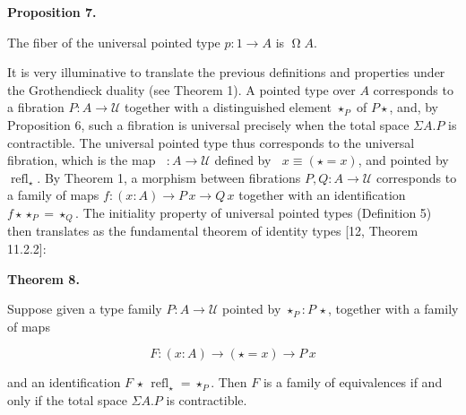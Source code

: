  
 
\par\medskip\noindent\textbf{Proposition 7.}\par
 
 
The fiber of the universal pointed type $p:1\to A$ is $\operatorname{\Omega}A$.\par
 
 
 
 
It is very illuminative to translate the previous definitions and properties under the Grothendieck duality (see Theorem 1). A pointed type over $A$ corresponds to a fibration $P:A\to\mathcal{U}$ together with a distinguished element $\star_{P}$ of $P\star$, and, by Proposition 6, such a fibration is universal precisely when the total space $\Sigma A.P$ is contractible. The universal pointed type thus corresponds to the universal fibration, which is the map $\mathop{\mathcal{F}_{A}}:A\to\mathcal{U}$ defined by $\mathop{\mathcal{F}_{A}}x\equiv(\star=x)$, and pointed by $\operatorname{refl}_{\star}$. By Theorem 1, a morphism between fibrations $P,Q:A\to\mathcal{U}$ corresponds to a family of maps $f:(x:A)\to P\,x\to Q\,x$ together with an identification $f\star\star_{P}=\star_{Q}$. The initiality property of universal pointed types (Definition 5) then translates as the fundamental theorem of identity types [12, Theorem 11.2.2]:\par
 
 
 
\par\medskip\noindent\textbf{Theorem 8.}\par
 
 
Suppose given a type family $P:A\to\mathcal{U}$ pointed by $\star_{P}:P\,\star$, together with a family of maps\par
  
\par  \quad  \[F:(x:A)\to(\star=x)\to P\,x\]\quad  \quad  
  
and an identification $F\,\star\,\operatorname{refl}_{\star}=\star_{P}$. Then $F$ is a family of equivalences if and only if the total space $\Sigma A.P$ is contractible.\par
 
